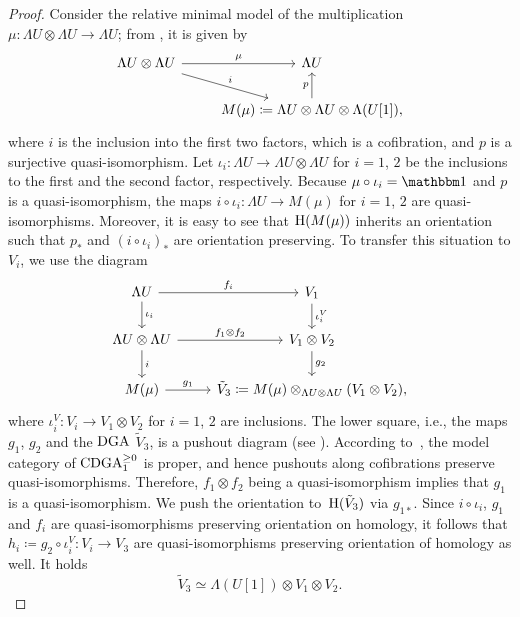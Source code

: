 \documentclass[\MainFolder/Text.tex]{subfiles}
\begin{document}
\begin{proof}
Consider the relative minimal model of the multiplication $\mu: \Lambda U \otimes \Lambda U \rightarrow \Lambda U$; from \cite[Example~2.48]{Felix2008}, it is given by
\begin{equation}\label{Eq:RelMinMod}
\begin{tikzcd}
\Lambda U \otimes \Lambda U\arrow{r}{\mu} \arrow{rd}{i} & \Lambda U \\
& M(\mu)\coloneqq \Lambda U \otimes \Lambda U \otimes \Lambda(U[1]), \arrow{u}{p}
\end{tikzcd}
\end{equation}
where $i$ is the inclusion into the first two factors, which is a cofibration, and $p$ is a surjective quasi-isomorphism. Let $\iota_i : \Lambda U \rightarrow \Lambda U \otimes \Lambda U$ for $i=1$, $2$ be the inclusions to the first and the second factor, respectively. Because $\mu \circ \iota_i = \Id$ and $p$ is a quasi-isomorphism, the maps $i \circ \iota_i : \Lambda U \rightarrow M(\mu)$ for $i=1$, $2$ are quasi-isomorphisms. Moreover, it is easy to see that $\mathrm{H}(M(\mu))$ inherits an orientation such that $p_*$ and $(i\circ \iota_i)_*$ are orientation preserving. To transfer this situation to $V_i$, we use the diagram
\begin{equation}\label{Eq:Pushout}
\begin{tikzcd}
\Lambda U \arrow{r}{f_i}\arrow{d}{\iota_i}& V_1 \arrow{d}{\iota_i^V} \\
\Lambda U \otimes \Lambda U \arrow{r}{f_1\otimes f_2} \arrow{d}{i} & V_1 \otimes V_2 \arrow{d}{g_2} \\
M(\mu) \arrow{r}{g_1} & \tilde{V}_3 \coloneqq  M(\mu) \otimes_{\Lambda U \otimes \Lambda U} (V_1\otimes V_2),
\end{tikzcd}
\end{equation}
where $\iota_i^V : V_i \rightarrow V_1 \otimes V_2$ for $i=1$, $2$ are inclusions. The lower square, i.e., the maps $g_1$, $g_2$ and the $\mathrm{DGA}$ $\tilde{V}_3$, is a pushout diagram (see \cite[Example~1.4]{LoopSpaces}). According to~\cite{MO204414}, the model category of $\mathrm{CDGA}_{1}^{\ge 0}$ is proper, and hence pushouts along cofibrations preserve quasi-isomorphisms. Therefore, $f_1\otimes f_2$ being a quasi-isomorphism implies that $g_1$ is a quasi-isomorphism. We push the orientation to~$\mathrm{H}(\tilde{V}_3)$ via $g_{1*}$. Since $i\circ \iota_i$, $g_1$ and $f_i$ are quasi-isomorphisms preserving orientation on homology, it follows that $h_i\coloneqq g_2\circ \iota_i^V:  V_i \rightarrow V_3$ are quasi-isomorphisms preserving orientation of homology as well. It holds
\[
\tilde{V}_3 \simeq \Lambda(U[1]) \otimes V_1 \otimes V_2.
\]
\end{proof}
\end{document}

